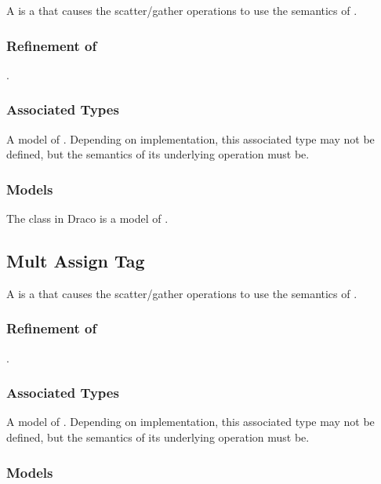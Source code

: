 \documentclass[11pt]{rnote}
\begin{document}
A  is a  that
causes the  scatter/gather operations to use
the semantics of .

\subsubsection{Refinement of}
.

\subsubsection{Associated Types}

A model of . Depending on implementation, this
associated type may not be defined, but the semantics of its
underlying operation must be.

\subsubsection{Models}

The  class in Draco is a model of
.

\newpage

\subsection{Mult Assign Tag}

A  is a  that
causes the  scatter/gather operations to use
the semantics of .

\subsubsection{Refinement of}
.

\subsubsection{Associated Types}

A model of . Depending on implementation, this
associated type may not be defined, but the semantics of its
underlying operation must be.

\subsubsection{Models}
\end{document}
